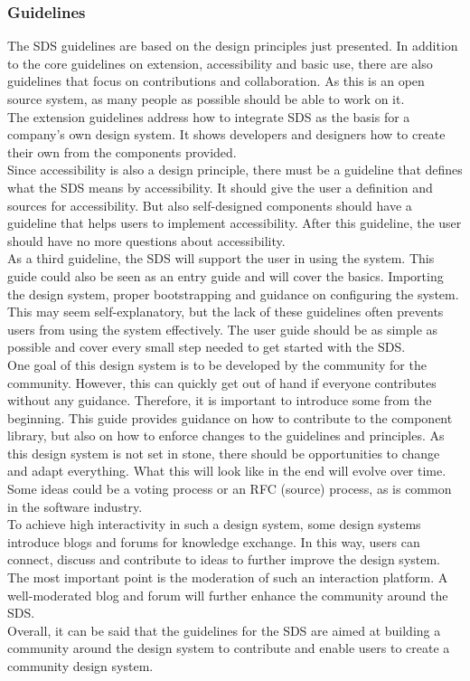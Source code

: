 \subsubsection{Guidelines}
The \ac{SDS} guidelines are based on the design principles just presented. In addition to the core guidelines on extension, accessibility and basic use, there are also guidelines that focus on contributions and collaboration. As this is an open source system, as many people as possible should be able to work on it. \\
The extension guidelines address how to integrate \ac{SDS} as the basis for a company's own design system. It shows developers and designers how to create their own from the components provided. \\
Since accessibility is also a design principle, there must be a guideline that defines what the \ac{SDS} means by accessibility. It should give the user a definition and sources for accessibility. But also self-designed components should have a guideline that helps users to implement accessibility. After this guideline, the user should have no more questions about accessibility. \\
As a third guideline, the \ac{SDS} will support the user in using the system. This guide could also be seen as an entry guide and will cover the basics. Importing the design system, proper bootstrapping and guidance on configuring the system. This may seem self-explanatory, but the lack of these guidelines often prevents users from using the system effectively. The user guide should be as simple as possible and cover every small step needed to get started with the \ac{SDS}. \\
One goal of this design system is to be developed by the community for the community. However, this can quickly get out of hand if everyone contributes without any guidance. Therefore, it is important to introduce some from the beginning. This guide provides guidance on how to contribute to the component library, but also on how to enforce changes to the guidelines and principles. As this design system is not set in stone, there should be opportunities to change and adapt everything. What this will look like in the end will evolve over time. Some ideas could be a voting process or an RFC (source) process, as is common in the software industry. \\
To achieve high interactivity in such a design system, some design systems introduce blogs and forums for knowledge exchange. In this way, users can connect, discuss and contribute to ideas to further improve the design system. The most important point is the moderation of such an interaction platform. A well-moderated blog and forum will further enhance the community around the \ac{SDS}. \\
Overall, it can be said that the guidelines for the \ac{SDS} are aimed at building a community around the design system to contribute and enable users to create a community design system. 
